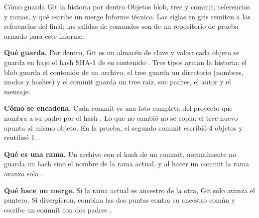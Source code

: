 \documentclass[10pt,a4paper]{article}
\begin{document}
  {Cómo guarda Git la historia por dentro}
  {Objetos blob, tree y commit, referencias y ramas, y qué escribe un merge}
  {Informe técnico. Las siglas en gris remiten a las referencias del final; las salidas de comandos son de un repositorio de prueba armado para este informe.}

\begin{cifras}[4]
\end{cifras}

\textbf{Qué guarda.} Por dentro, Git es un almacén de clave y valor: cada objeto se
guarda en  bajo el hash SHA-1 de su contenido . Tres
tipos arman la historia: el blob guarda el contenido de un archivo, el tree guarda un
directorio (nombres, modos y hashes) y el commit guarda un tree raíz, sus padres, el
autor y el mensaje.

\textbf{Cómo se encadena.} Cada commit es una foto completa del proyecto que nombra a su
padre por el hash . Lo que no cambió no se copia: el tree nuevo apunta al
mismo objeto. En la prueba, el segundo commit escribió 4 objetos y reutilizó 1
.

\textbf{Qué es una rama.} Un archivo con el hash de un commit.  normalmente no
guarda un hash sino el nombre de la rama actual, y al hacer un commit la rama avanza sola
.

\textbf{Qué hace un merge.} Si la rama actual es ancestro de la otra, Git solo avanza el
puntero. Si divergieron, combina las dos puntas contra su ancestro común y escribe un
commit con dos padres .


\indice

\vfill
\begin{bloque}
\end{bloque}
\end{document}
